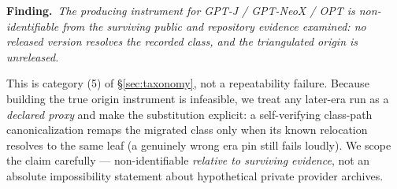 \par\smallskip\noindent\textbf{Finding.}~\emph{The producing instrument for GPT-J / GPT-NeoX / OPT is
\emph{non-identifiable from the surviving public and repository evidence
examined}: no released version resolves the recorded class, and the triangulated
origin is unreleased.}\par\smallskip
This is category (5) of \S\ref{sec:taxonomy}, not a repeatability failure. Because
building the true origin instrument is infeasible, we treat any later-era run as a
\emph{declared proxy} and make the substitution explicit: a self-verifying
class-path canonicalization remaps the migrated class only when its known
relocation resolves to the same leaf (a genuinely wrong era pin still fails
loudly). We scope the claim carefully --- non-identifiable \emph{relative to
surviving evidence}, not an absolute impossibility statement about hypothetical
private provider archives.
